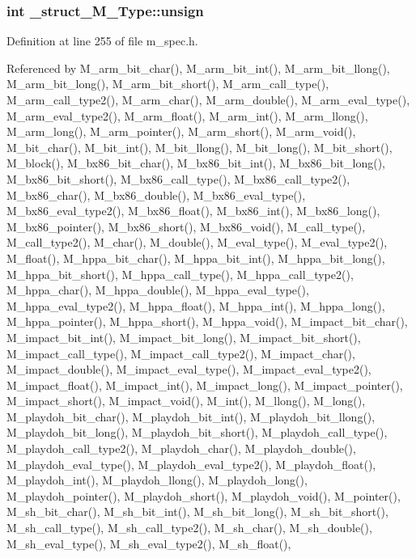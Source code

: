 \subsubsection{\setlength{\rightskip}{0pt plus 5cm}int \bf{\_\-struct\_\-M\_\-Type::unsign}}\label{struct__struct__M__Type_6699fd8636e1b5ec3481aa62bf832d0f}




Definition at line 255 of file m\_\-spec.h.

Referenced by M\_\-arm\_\-bit\_\-char(), M\_\-arm\_\-bit\_\-int(), M\_\-arm\_\-bit\_\-llong(), M\_\-arm\_\-bit\_\-long(), M\_\-arm\_\-bit\_\-short(), M\_\-arm\_\-call\_\-type(), M\_\-arm\_\-call\_\-type2(), M\_\-arm\_\-char(), M\_\-arm\_\-double(), M\_\-arm\_\-eval\_\-type(), M\_\-arm\_\-eval\_\-type2(), M\_\-arm\_\-float(), M\_\-arm\_\-int(), M\_\-arm\_\-llong(), M\_\-arm\_\-long(), M\_\-arm\_\-pointer(), M\_\-arm\_\-short(), M\_\-arm\_\-void(), M\_\-bit\_\-char(), M\_\-bit\_\-int(), M\_\-bit\_\-llong(), M\_\-bit\_\-long(), M\_\-bit\_\-short(), M\_\-block(), M\_\-bx86\_\-bit\_\-char(), M\_\-bx86\_\-bit\_\-int(), M\_\-bx86\_\-bit\_\-long(), M\_\-bx86\_\-bit\_\-short(), M\_\-bx86\_\-call\_\-type(), M\_\-bx86\_\-call\_\-type2(), M\_\-bx86\_\-char(), M\_\-bx86\_\-double(), M\_\-bx86\_\-eval\_\-type(), M\_\-bx86\_\-eval\_\-type2(), M\_\-bx86\_\-float(), M\_\-bx86\_\-int(), M\_\-bx86\_\-long(), M\_\-bx86\_\-pointer(), M\_\-bx86\_\-short(), M\_\-bx86\_\-void(), M\_\-call\_\-type(), M\_\-call\_\-type2(), M\_\-char(), M\_\-double(), M\_\-eval\_\-type(), M\_\-eval\_\-type2(), M\_\-float(), M\_\-hppa\_\-bit\_\-char(), M\_\-hppa\_\-bit\_\-int(), M\_\-hppa\_\-bit\_\-long(), M\_\-hppa\_\-bit\_\-short(), M\_\-hppa\_\-call\_\-type(), M\_\-hppa\_\-call\_\-type2(), M\_\-hppa\_\-char(), M\_\-hppa\_\-double(), M\_\-hppa\_\-eval\_\-type(), M\_\-hppa\_\-eval\_\-type2(), M\_\-hppa\_\-float(), M\_\-hppa\_\-int(), M\_\-hppa\_\-long(), M\_\-hppa\_\-pointer(), M\_\-hppa\_\-short(), M\_\-hppa\_\-void(), M\_\-impact\_\-bit\_\-char(), M\_\-impact\_\-bit\_\-int(), M\_\-impact\_\-bit\_\-long(), M\_\-impact\_\-bit\_\-short(), M\_\-impact\_\-call\_\-type(), M\_\-impact\_\-call\_\-type2(), M\_\-impact\_\-char(), M\_\-impact\_\-double(), M\_\-impact\_\-eval\_\-type(), M\_\-impact\_\-eval\_\-type2(), M\_\-impact\_\-float(), M\_\-impact\_\-int(), M\_\-impact\_\-long(), M\_\-impact\_\-pointer(), M\_\-impact\_\-short(), M\_\-impact\_\-void(), M\_\-int(), M\_\-llong(), M\_\-long(), M\_\-playdoh\_\-bit\_\-char(), M\_\-playdoh\_\-bit\_\-int(), M\_\-playdoh\_\-bit\_\-llong(), M\_\-playdoh\_\-bit\_\-long(), M\_\-playdoh\_\-bit\_\-short(), M\_\-playdoh\_\-call\_\-type(), M\_\-playdoh\_\-call\_\-type2(), M\_\-playdoh\_\-char(), M\_\-playdoh\_\-double(), M\_\-playdoh\_\-eval\_\-type(), M\_\-playdoh\_\-eval\_\-type2(), M\_\-playdoh\_\-float(), M\_\-playdoh\_\-int(), M\_\-playdoh\_\-llong(), M\_\-playdoh\_\-long(), M\_\-playdoh\_\-pointer(), M\_\-playdoh\_\-short(), M\_\-playdoh\_\-void(), M\_\-pointer(), M\_\-sh\_\-bit\_\-char(), M\_\-sh\_\-bit\_\-int(), M\_\-sh\_\-bit\_\-long(), M\_\-sh\_\-bit\_\-short(), M\_\-sh\_\-call\_\-type(), M\_\-sh\_\-call\_\-type2(), M\_\-sh\_\-char(), M\_\-sh\_\-double(), M\_\-sh\_\-eval\_\-type(), M\_\-sh\_\-eval\_\-type2(), M\_\-sh\_\-float(), 